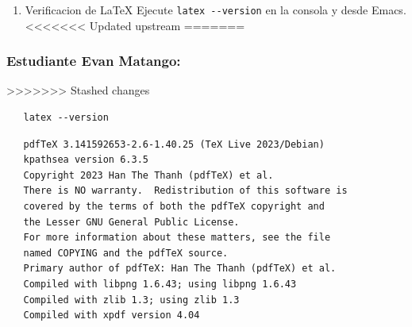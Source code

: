 \documentclass{article}
\begin{document}
\begin{enumerate}
\begin{verbatim}
GNU Emacs 29.3
Copyright (C) 2024 Free Software Foundation, Inc.
GNU Emacs comes with ABSOLUTELY NO WARRANTY.
You may redistribute copies of GNU Emacs
under the terms of the GNU General Public License.
For more information about these matters, see the file named COPYING.
\end{verbatim}

\subsubsection{Estudiante Karen Suarez:}
\label{sec:org0d1adc2}
>>>>>>> Stashed changes

\begin{verbatim}
   emacs --version
\end{verbatim}

\begin{verbatim}
GNU Emacs 29.3
Copyright (C) 2024 Free Software Foundation, Inc.
GNU Emacs comes with ABSOLUTELY NO WARRANTY.
You may redistribute copies of GNU Emacs
under the terms of the GNU General Public License.
For more information about these matters, see the file named COPYING.
\end{verbatim}

\item Verificacion de \LaTeX{}
Ejecute \texttt{latex -{}-{}version} en la consola y desde Emacs.
<<<<<<< Updated upstream
=======
\end{enumerate}

\subsubsection{Estudiante Evan Matango:}
\label{sec:org31821dd}
>>>>>>> Stashed changes

\begin{verbatim}
   latex --version
\end{verbatim}

\begin{verbatim}
   pdfTeX 3.141592653-2.6-1.40.25 (TeX Live 2023/Debian)
   kpathsea version 6.3.5
   Copyright 2023 Han The Thanh (pdfTeX) et al.
   There is NO warranty.  Redistribution of this software is
   covered by the terms of both the pdfTeX copyright and
   the Lesser GNU General Public License.
   For more information about these matters, see the file
   named COPYING and the pdfTeX source.
   Primary author of pdfTeX: Han The Thanh (pdfTeX) et al.
   Compiled with libpng 1.6.43; using libpng 1.6.43
   Compiled with zlib 1.3; using zlib 1.3
   Compiled with xpdf version 4.04
\end{verbatim}
\end{document}
